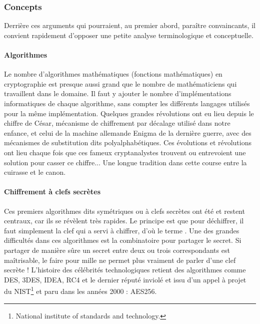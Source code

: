 \subsubsection{Concepts}
Derrière ces arguments qui pourraient, au premier abord, paraître convaincants, il convient rapidement d'opposer une petite analyse terminologique et conceptuelle.

\paragraph{Algorithmes}\newline
Le nombre d'algorithmes mathématiques (fonctions mathématiques) en cryptographie est presque aussi grand que le nombre de mathématiciens qui travaillent dans le domaine. Il faut y ajouter le nombre d'implémentations informatiques de chaque algorithme, sans compter les différents langages utilisés pour la même implémentation.
Quelques grandes révolutions ont eu lieu depuis le chiffre de César, mécanisme de chiffrement par décalage  utilisé dans notre enfance, et celui de la machine allemande Enigma de la dernière guerre, avec des mécanismes de substitution dits polyalphabétiques. Ces évolutions et révolutions ont lieu chaque fois que ces fameux cryptanalystes trouvent ou entrevoient une solution pour casser ce chiffre... Une longue tradition dans cette course entre la cuirasse et le canon.


\paragraph{Chiffrement à clefs secrètes} 
Ces premiers algorithmes dits symétriques ou à clefs secrètes ont été et restent centraux, car ils se révèlent très rapides. Le principe est que pour déchiffrer, il faut simplement la clef qui a servi à chiffrer, d'où le terme .
Une des grandes difficultés dans ces algorithmes est la combinatoire pour partager le secret. Si partager de manière sûre un secret entre deux ou trois correspondants est maîtrisable, le faire pour mille ne permet plus vraiment de parler d'une clef secrète ! L'histoire des célébrités technologiques retient des algorithmes comme DES, 3DES, IDEA, RC4 et le dernier réputé inviolé et issu d'un appel à projet du NIST\footnote{National institute of standards and technology.} et paru dans les années 2000 : AES256.

